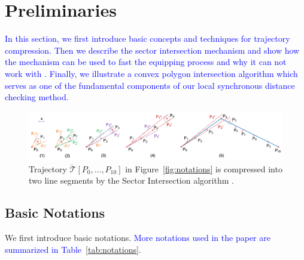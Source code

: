 \section{Preliminaries}
\label{sec-preliminary}

\textcolor{blue}{
In this section, we first introduce basic concepts and techniques for trajectory compression.
Then we describe the sector intersection mechanism and show how the mechanism can be used to fast the \ped equipping \lsa process and why it can not work with \sed.
Finally, we illustrate a convex polygon intersection algorithm which serves as one of the fundamental components of our local synchronous distance checking method.
}


\begin{figure}[tb!]
\centering
\includegraphics[scale=0.8]{figures/Fig-sleeve.png}
\vspace{-2ex}
\caption{\small Trajectory $\dddot{\mathcal{T}}[P_0, \ldots, P_{10}]$ in Figure~\ref{fig:notations} is compressed into two line segments by the Sector Intersection algorithm  \cite{Williams:Longest, Sklansky:Cone}.}
\vspace{-2ex}
\label{fig:sleeve}
\end{figure}



\subsection{Basic Notations}
We first introduce basic notations. 
\textcolor{blue}{More notations used in the paper are summarized in Table~\ref{tab:notations}.}

